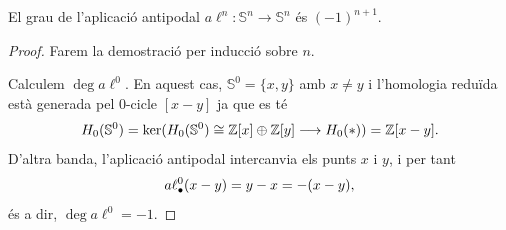 \documentclass[../main.tex]{subfiles}
\begin{document}
\begin{prop}\label{prop:grauantipodal}
El grau de l'aplicació antipodal $a\ell^n:\mathbb{S}^n\rightarrow\mathbb{S}^n$ és $(-1)^{n+1}$.
\end{prop}
\begin{proof}
Farem la demostració per inducció sobre $n$. 

Calculem $\deg a\ell^0$. En aquest cas, $\mathbb{S}^0 = \{x,y\}$ amb $x\not=y$ i l'homologia reduïda està generada pel $0$-cicle $[x-y]$ ja que es té
\begin{equation}
    \notag
    H_0(\mathbb{S}^0) = \ker(H_0(\mathbb{S}^0)\cong\mathbb{Z}[x]\oplus \mathbb{Z}[y]\longrightarrow H_0(*))=\mathbb{Z}[x-y].   
\end{equation}
D'altra banda, l'aplicació antipodal intercanvia els punts $x$ i $y$, i per tant
\begin{equation}
    \notag
    a\ell^0_\bullet(x-y) = y-x = -(x-y),
\end{equation}
és a dir, $\deg a\ell^0 = -1$.


\end{proof}
\end{document}
